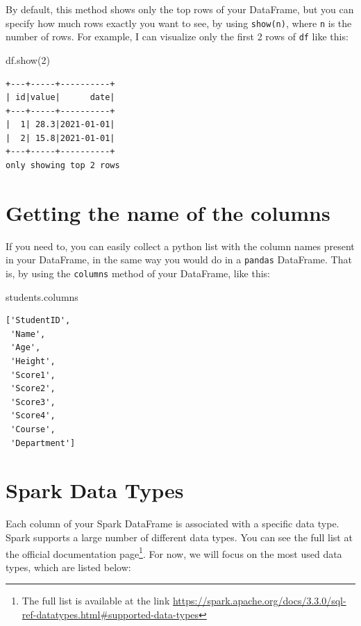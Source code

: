 \documentclass[
  11pt,
  letterpaper,
  DIV=11,
  numbers=noendperiod]{scrreprt}
\newenvironment{Shaded}{\begin{snugshade}}{\end{snugshade}}
\newcommand{\DecValTok}[1]{\textcolor[rgb]{0.68,0.00,0.00}{#1}}
\newcommand{\NormalTok}[1]{\textcolor[rgb]{0.00,0.23,0.31}{#1}}
\begin{document}
By default, this method shows only the top rows of your DataFrame, but
you can specify how much rows exactly you want to see, by using
\texttt{show(n)}, where \texttt{n} is the number of rows. For example, I
can visualize only the first 2 rows of \texttt{df} like this:

\begin{Shaded}
\begin{Highlighting}[]
\NormalTok{df.show(}\DecValTok{2}\NormalTok{)}
\end{Highlighting}
\end{Shaded}

\begin{verbatim}
+---+-----+----------+
| id|value|      date|
+---+-----+----------+
|  1| 28.3|2021-01-01|
|  2| 15.8|2021-01-01|
+---+-----+----------+
only showing top 2 rows
\end{verbatim}

\hypertarget{getting-the-name-of-the-columns}{%
\section{Getting the name of the
columns}\label{getting-the-name-of-the-columns}}

If you need to, you can easily collect a python list with the column
names present in your DataFrame, in the same way you would do in a
\texttt{pandas} DataFrame. That is, by using the \texttt{columns} method
of your DataFrame, like this:

\begin{Shaded}
\begin{Highlighting}[]
\NormalTok{students.columns}
\end{Highlighting}
\end{Shaded}

\begin{verbatim}
['StudentID',
 'Name',
 'Age',
 'Height',
 'Score1',
 'Score2',
 'Score3',
 'Score4',
 'Course',
 'Department']
\end{verbatim}

\hypertarget{spark-data-types}{%
\section{Spark Data Types}\label{spark-data-types}}

Each column of your Spark DataFrame is associated with a specific data
type. Spark supports a large number of different data types. You can see
the full list at the official documentation page\footnote{The full list
  is available at the link
  \url{https://spark.apache.org/docs/3.3.0/sql-ref-datatypes.html\#supported-data-types}}.
For now, we will focus on the most used data types, which are listed
below:
\end{document}
